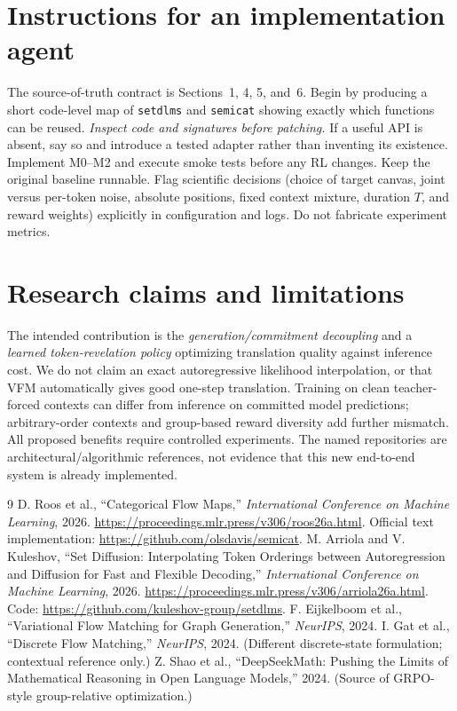 \documentclass[11pt,a4paper]{article}
\begin{document}
\section{Instructions for an implementation agent}
The source-of-truth contract is Sections~1, 4, 5, and~6. Begin by producing a short code-level map of \texttt{setdlms} and \texttt{semicat} showing exactly which functions can be reused. \emph{Inspect code and signatures before patching.} If a useful API is absent, say so and introduce a tested adapter rather than inventing its existence. Implement M0--M2 and execute smoke tests before any RL changes. Keep the original baseline runnable. Flag scientific decisions (choice of target canvas, joint versus per-token noise, absolute positions, fixed context mixture, duration $T$, and reward weights) explicitly in configuration and logs. Do not fabricate experiment metrics.

\section{Research claims and limitations}
The intended contribution is the \emph{generation/commitment decoupling} and a \emph{learned token-revelation policy} optimizing translation quality against inference cost. We do not claim an exact autoregressive likelihood interpolation, or that VFM automatically gives good one-step translation. Training on clean teacher-forced contexts can differ from inference on committed model predictions; arbitrary-order contexts and group-based reward diversity add further mismatch. All proposed benefits require controlled experiments. The named repositories are architectural/algorithmic references, not evidence that this new end-to-end system is already implemented.

\clearpage
\begin{thebibliography}{9}
 D. Roos et al., ``Categorical Flow Maps,'' \emph{International Conference on Machine Learning}, 2026. \url{https://proceedings.mlr.press/v306/roos26a.html}. Official text implementation: \url{https://github.com/olsdavis/semicat}.
 M. Arriola and V. Kuleshov, ``Set Diffusion: Interpolating Token Orderings between Autoregression and Diffusion for Fast and Flexible Decoding,'' \emph{International Conference on Machine Learning}, 2026. \url{https://proceedings.mlr.press/v306/arriola26a.html}. Code: \url{https://github.com/kuleshov-group/setdlms}.
 F. Eijkelboom et al., ``Variational Flow Matching for Graph Generation,'' \emph{NeurIPS}, 2024.
 I. Gat et al., ``Discrete Flow Matching,'' \emph{NeurIPS}, 2024. (Different discrete-state formulation; contextual reference only.)
 Z. Shao et al., ``DeepSeekMath: Pushing the Limits of Mathematical Reasoning in Open Language Models,'' 2024. (Source of GRPO-style group-relative optimization.)
\end{thebibliography}
\end{document}
